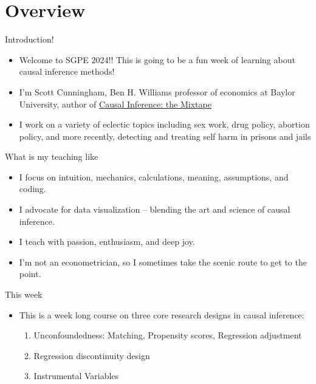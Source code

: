 \documentclass{beamer}
\begin{document}





\section{Overview}

\begin{frame}{Introduction!}

  \begin{itemize}
  	\item Welcome to SGPE 2024!!  This is going to be a fun week of learning about causal inference methods!
	\item I'm Scott Cunningham, Ben H. Williams professor of economics at Baylor University, author of \underline{Causal Inference: the Mixtape}
	\item I work on a variety of eclectic topics including sex work, drug policy, abortion policy, and more recently, detecting and treating self harm in prisons and jails
  \end{itemize}

\end{frame}


\begin{frame}{What is my teaching like}
    \begin{itemize}
        \item I focus on intuition, mechanics, calculations, meaning, assumptions, and coding.
        \item I advocate for data visualization – blending the art and science of causal inference.
        \item I teach with passion, enthusiasm, and deep joy.
        \item I'm not an econometrician, so I sometimes take the scenic route to get to the point.
    \end{itemize}
\end{frame}



\begin{frame}{This week}

  \begin{itemize}
    \item This is a week long course on three core research designs in causal inference:
    	\begin{enumerate}
	\item Unconfoundedness: Matching, Propensity scores, Regression adjustment
	\item Regression discontinuity design
	\item Instrumental Variables
	\end{enumerate}
  \end{itemize}

\end{frame}
\end{document}
